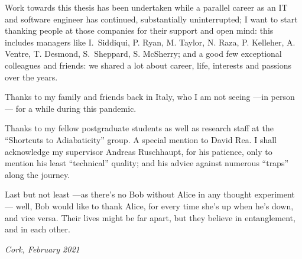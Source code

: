 {
  Work towards this thesis has been undertaken while a parallel career
  as an IT and software engineer has continued,
  substantially uninterrupted;
  I want to start thanking people at those companies for their support and open mind:
  this includes managers like
  I.~Siddiqui, P. Ryan, M. Taylor, N. Raza, P. Kelleher, A. Ventre, T. Desmond, S.~Sheppard, S. McSherry;
  and a good few exceptional colleagues and friends:
  we shared a lot about career, life, interests and passions over the years.

  Thanks to my family and friends back in Italy,
  who I am not seeing ---in person--- for a while during this pandemic.

  Thanks to my fellow postgraduate students
  as well as research staff
  at the ``Shortcuts to Adiabaticity'' group.
  A special mention to David Rea.
  I shall acknowledge my supervisor Andreas Ruschhaupt, for his patience,
  only to mention his least ``technical'' quality;
  and his advice against numerous ``traps'' along the journey.

  Last but not least ---as there's no Bob without Alice in any thought experiment---
  well, Bob would like to thank Alice,
  for every time she’s up when he’s down, and vice versa.
  Their lives might be far apart, but they believe in entanglement, and in each other.

  \emph{Cork, February 2021}
}